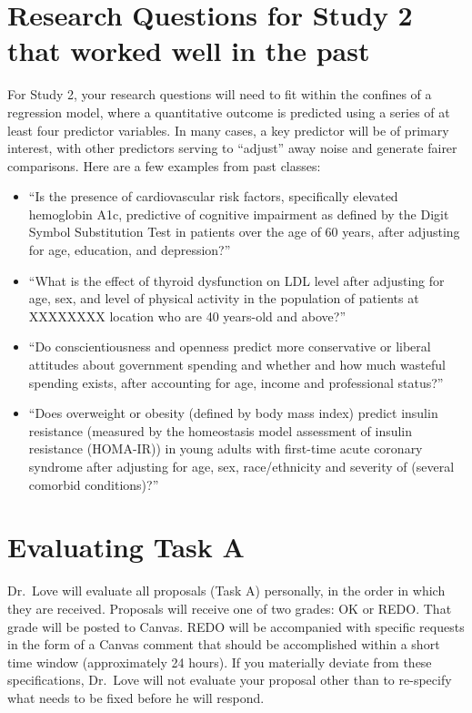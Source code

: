 \documentclass[]{book}
\providecommand{\tightlist}{%
  \setlength{\itemsep}{0pt}\setlength{\parskip}{0pt}}
\theoremstyle{definition}
\theoremstyle{definition}
\theoremstyle{definition}
\theoremstyle{remark}
\begin{document}
\hypertarget{research-questions-for-study-2-that-worked-well-in-the-past}{%
\section{Research Questions for Study 2 that worked well in the
past}\label{research-questions-for-study-2-that-worked-well-in-the-past}}

For Study 2, your research questions will need to fit within the
confines of a regression model, where a quantitative outcome is
predicted using a series of at least four predictor variables. In many
cases, a key predictor will be of primary interest, with other
predictors serving to ``adjust'' away noise and generate fairer
comparisons. Here are a few examples from past classes:

\begin{itemize}
\tightlist
\item
  ``Is the presence of cardiovascular risk factors, specifically
  elevated hemoglobin A1c, predictive of cognitive impairment as defined
  by the Digit Symbol Substitution Test in patients over the age of 60
  years, after adjusting for age, education, and depression?''
\item
  ``What is the effect of thyroid dysfunction on LDL level after
  adjusting for age, sex, and level of physical activity in the
  population of patients at XXXXXXXX location who are 40 years-old and
  above?''
\item
  ``Do conscientiousness and openness predict more conservative or
  liberal attitudes about government spending and whether and how much
  wasteful spending exists, after accounting for age, income and
  professional status?''
\item
  ``Does overweight or obesity (defined by body mass index) predict
  insulin resistance (measured by the homeostasis model assessment of
  insulin resistance (HOMA-IR)) in young adults with first-time acute
  coronary syndrome after adjusting for age, sex, race/ethnicity and
  severity of (several comorbid conditions)?''
\end{itemize}

\hypertarget{evaluating-task-a}{%
\section{Evaluating Task A}\label{evaluating-task-a}}

Dr.~Love will evaluate all proposals (Task A) personally, in the order
in which they are received. Proposals will receive one of two grades: OK
or REDO. That grade will be posted to Canvas. REDO will be accompanied
with specific requests in the form of a Canvas comment that should be
accomplished within a short time window (approximately 24 hours). If you
materially deviate from these specifications, Dr.~Love will not evaluate
your proposal other than to re-specify what needs to be fixed before he
will respond.
\end{document}

